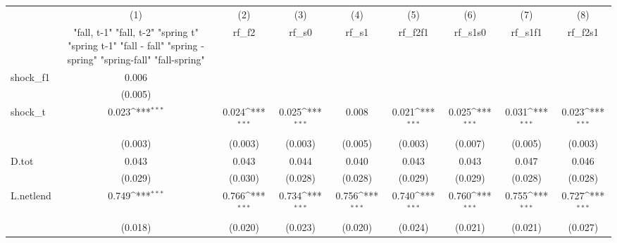 {
\def\sym#1{\ifmmode^{#1}\else\(^{#1}\)\fi}
\begin{tabular}{l*{8}{c}}
\toprule
            &\multicolumn{1}{c}{(1)}&\multicolumn{1}{c}{(2)}&\multicolumn{1}{c}{(3)}&\multicolumn{1}{c}{(4)}&\multicolumn{1}{c}{(5)}&\multicolumn{1}{c}{(6)}&\multicolumn{1}{c}{(7)}&\multicolumn{1}{c}{(8)}\\
            &\multicolumn{1}{c}{  "fall, t-1" "fall, t-2" "spring t" "spring t-1"  "fall - fall" "spring - spring" "spring-fall" "fall-spring" }&\multicolumn{1}{c}{rf\_f2}&\multicolumn{1}{c}{rf\_s0}&\multicolumn{1}{c}{rf\_s1}&\multicolumn{1}{c}{rf\_f2f1}&\multicolumn{1}{c}{rf\_s1s0}&\multicolumn{1}{c}{rf\_s1f1}&\multicolumn{1}{c}{rf\_f2s1}\\
\midrule
shock\_f1    &       0.006         &                     &                     &                     &                     &                     &                     &                     \\
            &     (0.005)         &                     &                     &                     &                     &                     &                     &                     \\
\addlinespace
shock\_t     &       0.023\sym{***}&       0.024\sym{***}&       0.025\sym{***}&       0.008         &       0.021\sym{***}&       0.025\sym{***}&       0.031\sym{***}&       0.023\sym{***}\\
            &     (0.003)         &     (0.003)         &     (0.003)         &     (0.005)         &     (0.003)         &     (0.007)         &     (0.005)         &     (0.003)         \\
\addlinespace
D.tot       &       0.043         &       0.043         &       0.044         &       0.040         &       0.043         &       0.043         &       0.047         &       0.046         \\
            &     (0.029)         &     (0.030)         &     (0.028)         &     (0.028)         &     (0.029)         &     (0.029)         &     (0.028)         &     (0.028)         \\
\addlinespace
L.netlend   &       0.749\sym{***}&       0.766\sym{***}&       0.734\sym{***}&       0.756\sym{***}&       0.740\sym{***}&       0.760\sym{***}&       0.755\sym{***}&       0.727\sym{***}\\
            &     (0.018)         &     (0.020)         &     (0.023)         &     (0.020)         &     (0.024)         &     (0.021)         &     (0.021)         &     (0.027)         \\

\end{tabular}}
